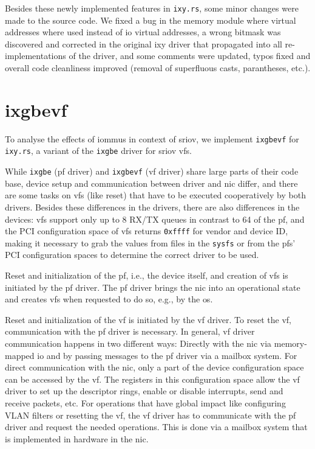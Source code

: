 Besides these newly implemented features in \texttt{ixy.rs}, some minor changes
were made to the source code. We fixed a bug in the memory module where virtual
addresses where used instead of \ac{io} virtual addresses, a wrong bitmask was
discovered and corrected in the original ixy driver \cite{emmerich2019user} that
propagated into all re-implementations \cite{emmerich2019case} of the driver,
and some comments were updated, typos fixed and overall code cleanliness
improved (removal of superfluous casts, parantheses, etc.).


\section{ixgbevf}
\label{sec:ixgbevf}

To analyse the effects of \acp{iommu} in context of \ac{sriov}, we implement
\texttt{ixgbevf} for \texttt{ixy.rs}, a variant of the \texttt{ixgbe} driver for
\ac{sriov} \acp{vf}.

While \texttt{ixgbe} (\ac{pf} driver) and \texttt{ixgbevf} (\ac{vf} driver)
share large parts of their code base, device setup and communication between
driver and \ac{nic} differ, and there are some tasks on \acp{vf} (like reset)
that have to be executed cooperatively by both drivers. Besides these
differences in the drivers, there are also differences in the devices: \acp{vf}
support only up to 8 RX/TX queues in contrast to 64 of the \ac{pf}, and the PCI
configuration space of \acp{vf} returns \texttt{0xffff} for vendor and device
ID, making it necessary to grab the values from files in the \texttt{sysfs} or
from the \acp{pf}' PCI configuration spaces to determine the correct driver to
be used.

Reset and initialization of the \ac{pf}, i.e., the device itself, and creation
of \acp{vf} is initiated by the \ac{pf} driver. The \ac{pf} driver brings the
\ac{nic} into an operational state and creates \acp{vf} when requested to do so,
e.g., by the \ac{os}.

Reset and initialization of the \ac{vf} is initiated by the \ac{vf} driver. To
reset the \ac{vf}, communication with the \ac{pf} driver is necessary. In
general, \ac{vf} driver communication happens in two different ways: Directly
with the \ac{nic} via memory-mapped \ac{io} and by passing messages to the
\ac{pf} driver via a mailbox system. For direct communication with the \ac{nic},
only a part of the device configuration space can be accessed by the \ac{vf}.
The registers in this configuration space allow the \ac{vf} driver to set up the
descriptor rings, enable or disable interrupts, send and receive packets, etc.
For operations that have global impact like configuring VLAN filters or
resetting the \ac{vf}, the \ac{vf} driver has to communicate with the \ac{pf}
driver and request the needed operations. This is done via a mailbox system that
is implemented in hardware in the \ac{nic}.

